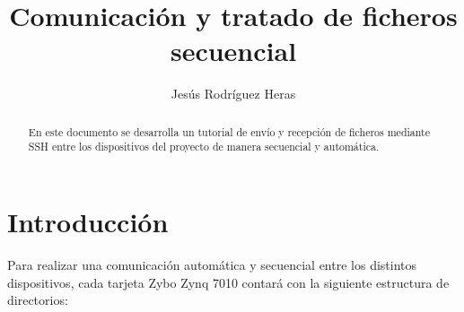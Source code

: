 \documentclass[12pt,letterpaper]{article}
\title{Comunicación y tratado de ficheros secuencial}
\author{Jesús Rodríguez Heras}
\begin{document}
	
	\maketitle
	\begin{abstract} %
		\begin{center}
			En este documento se desarrolla un tutorial de envío y recepción de ficheros mediante SSH entre los dispositivos del proyecto de manera secuencial y automática.
		\end{center}
	\end{abstract}
	\thispagestyle{empty}
	\newpage
	
	\tableofcontents
	\newpage
	
	
	
	
	\lstset{language=bash, numbers=left, numberstyle=\tiny, numbersep=10pt, firstnumber=1, stepnumber=1, basicstyle=\small\ttfamily, tabsize=2, extendedchars=true, inputencoding=utf8/latin1, breaklines=true}
	

\section{Introducción}
Para realizar una comunicación automática y secuencial entre los distintos dispositivos, cada tarjeta Zybo Zynq 7010 contará con la siguiente estructura de directorios:\\
\end{document}
